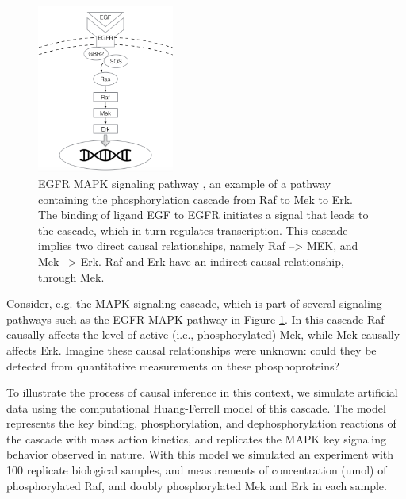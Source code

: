 \documentclass[journal=jacsat,manuscript=article]{achemso}
\begin{document}
\begin{figure}[!tpb]
\centerline{\includegraphics[width=0.4\textwidth]{figs/egfr.png}}
\caption{EGFR MAPK signaling pathway \cite{holbro2004erbb}, an example of a pathway containing the phosphorylation cascade from Raf to Mek to Erk.  The binding of ligand EGF to EGFR initiates a signal that leads to the cascade, which in turn regulates transcription.  This cascade implies two direct causal relationships, namely Raf --> MEK, and Mek --> Erk.  Raf and Erk have an indirect causal relationship, through Mek.\label{mapk}}
\end{figure}

Consider, e.g. the MAPK signaling cascade, which is part of several signaling pathways such as the EGFR MAPK pathway in Figure \ref{mapk}. In this cascade Raf causally affects the level of active (i.e., phosphorylated) Mek, while Mek causally affects Erk. Imagine these causal relationships were unknown: could they be detected from quantitative measurements on these phosphoproteins?  

To illustrate the process of causal inference in this context, we simulate artificial data using the computational Huang-Ferrell model of this cascade. The model represents the key binding, phosphorylation, and dephosphorylation reactions of the cascade with mass action kinetics, and replicates the MAPK key signaling behavior observed in nature.  With this model we simulated an experiment with 100 replicate biological samples, and measurements of concentration (umol) of phosphorylated Raf, and doubly phosphorylated Mek and Erk in each sample. 
\end{document}
